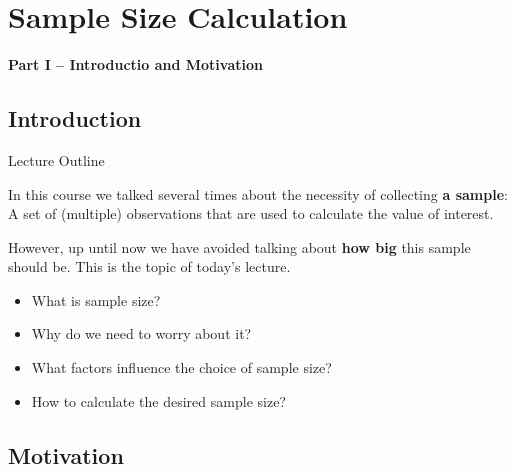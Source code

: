 \section{Sample Size Calculation}

\begin{frame}{}
  \begin{center}
    {\bf Part I -- Introductio and Motivation}
  \end{center}
\end{frame}

\subsection{Introduction}

\begin{frame}{Lecture Outline}

  In this course we talked several times about the necessity
  of collecting {\bf a sample}: A set of (multiple) observations
  that are used to calculate the value of interest.
  \bigskip

  However, up until now we have avoided talking about {\bf how big} this sample should be. This is the topic of today's lecture.\bigskip

  \begin{itemize}
    \item What is sample size?
    \item Why do we need to worry about it?
    \item What factors influence the choice of sample size?
    \item How to calculate the desired sample size?
  \end{itemize}

\end{frame}


\subsection{Motivation}

